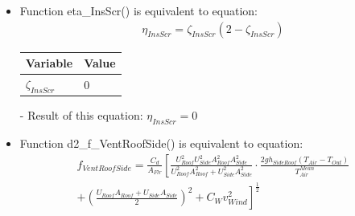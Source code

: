 \documentclass[a4paper]{article}
\begin{document}
\begin{itemize}
  \item Function eta\_InsScr() is equivalent to equation:
        \begin{align*}
          \eta_{InsScr} = \zeta_{InsScr} (2 -  \zeta_{InsScr})
        \end{align*}

        \begin{table}[H]
          \centering
          \begin{tabular}{|l|l|}
            \hline
            \textbf{Variable}  & \textbf{Value} \\ \hline
            \(\zeta_{InsScr}\) & 0              \\ \hline
          \end{tabular}
        \end{table}

  \item[-] Result of this equation: \(\eta_{InsScr} = 0\)

  \item Function d2\_f\_VentRoofSide() is equivalent to equation:
        \begin{align*}
          f_{VentRoofSide} = \frac{C_d}{A_{Flr}} \left[\frac{U_{Roof}^2 U_{Side}^2 A_{Roof}^2 A_{Side}^2}{U_{Roof}^2 A_{Roof}^2 + U_{Side}^2 A_{Side}^2} \cdot \frac{2gh_{SideRoof} (T_{Air} - T_{Out})}{T_{Air}^{Mean}}\right. \\
          + \left.{ \left(\frac{U_{Roof} A_{Roof} + U_{Side} A_{Side}}{2}\right)}^2 + C_W v_{Wind}^2\right]^{\frac{1}{2}}
        \end{align*}


\end{itemize}
\end{document}
